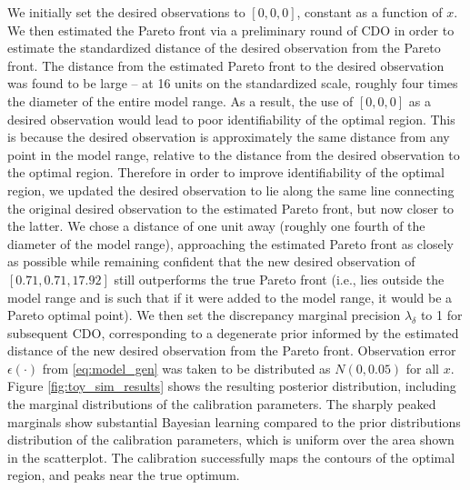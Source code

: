 \documentclass[12pt]{article}
\begin{document}
We initially set the desired observations to $[0,0,0]$, constant as a function of $x$. 
%
We then estimated the Pareto front via a preliminary round of CDO in order to estimate the standardized distance of the desired observation from the Pareto front.
%
The distance from the estimated Pareto front to the desired observation was found to be large -- at 16 units on the standardized scale, roughly four times the diameter of the entire model range.
%
As a result, the use of $[0,0,0]$ as a desired observation would lead to poor identifiability of the optimal region. 
%
This is because the desired observation is approximately the same distance from any point in the model range, relative to the distance from the desired observation to the optimal region.
%
Therefore in order to improve identifiability of the optimal region, we updated the desired observation to lie along the same line connecting the original desired observation to the estimated Pareto front, but now closer to the latter.
%
We chose a distance of one unit away (roughly one fourth of the diameter of the model range), approaching the estimated Pareto front as closely as possible while remaining confident that the new desired observation of $[0.71, 0.71, 17.92]$ still outperforms the true Pareto front (i.e., lies outside the model range and is such that if it were added to the model range, it would be a Pareto optimal point).
%
We then set the discrepancy marginal precision $\lambda_\delta$ to 1 for subsequent CDO, corresponding to a degenerate prior informed by the estimated distance of the new desired observation from the Pareto front.
%
Observation error $\epsilon(\cdot)$ from \eqref{eq:model_gen} was taken to be distributed as $N(0,0.05)$ for all $x$.
%
Figure \ref{fig:toy_sim_results} shows the resulting posterior distribution, including the marginal distributions of the calibration parameters. 
%
The sharply peaked marginals show substantial Bayesian learning compared to the prior distributions distribution of the calibration parameters, which is uniform over the area shown in the scatterplot. 
%
The calibration successfully maps the contours of the optimal region, and peaks near the true optimum. 
%
\end{document}
